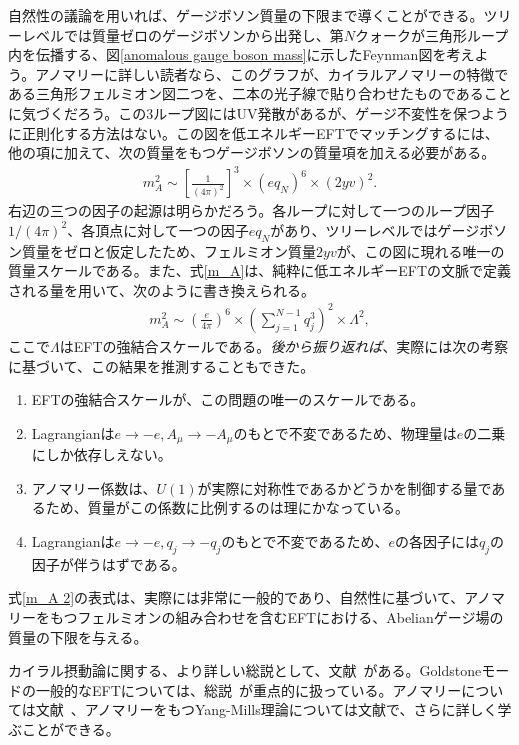 自然性の議論を用いれば、ゲージボソン質量の下限まで導くことができる。ツリーレベルでは質量ゼロのゲージボソンから出発し、第$N$クォークが三角形ループ内を伝播する、図\ref{anomalous gauge boson mass}に示したFeynman図を考えよう。アノマリーに詳しい読者なら、このグラフが、カイラルアノマリーの特徴である三角形フェルミオン図二つを、二本の光子線で貼り合わせたものであることに気づくだろう。この3ループ図にはUV発散があるが、ゲージ不変性を保つように正則化する方法はない。この図を低エネルギーEFTでマッチングするには、他の項に加えて、次の質量をもつゲージボソンの質量項を加える必要がある。
%
\begin{align} \label{m_A}
	m_A^2 \sim \left[\frac{1}{(4 \pi)^2}\right]^3 \times (e q_N)^6 \times (2 y v)^2 . 
\end{align}
%
右辺の三つの因子の起源は明らかだろう。各ループに対して一つのループ因子$1/(4 \pi)^2$、各頂点に対して一つの因子$e q_N$があり、ツリーレベルではゲージボソン質量をゼロと仮定したため、フェルミオン質量$2 y v$が、この図に現れる唯一の質量スケールである。また、式\eqref{m_A}は、純粋に低エネルギーEFTの文脈で定義される量を用いて、次のように書き換えられる。
%
\begin{align} \label{m_A 2}
	m_A^2 \sim \left(\frac{e}{4 \pi}\right)^6 \times \left(\sum_{j=1}^{N-1} q_j^3 \right)^2 \times \Lambda^2 ,
\end{align}
% 
ここで$\Lambda$はEFTの強結合スケールである。\emph{後から振り返れば}、実際には次の考察に基づいて、この結果を推測することもできた。
%
\begin{enumerate}
	\item EFTの強結合スケールが、この問題の唯一のスケールである。
	\item Lagrangianは$e \to -e, A_\mu \to - A_\mu$のもとで不変であるため、物理量は$e$の二乗にしか依存しえない。
	\item アノマリー係数は、$U(1)$が実際に対称性であるかどうかを制御する量であるため、質量がこの係数に比例するのは理にかなっている。
	\item Lagrangianは$e \to -e, q_j \to - q_j$のもとで不変であるため、$e$の各因子には$q_j$の因子が伴うはずである。
\end{enumerate}
%
式\eqref{m_A 2}の表式は、実際には非常に一般的であり、自然性に基づいて、アノマリーをもつフェルミオンの組み合わせを含むEFTにおける、Abelianゲージ場の質量の下限を与える。




カイラル摂動論に関する、より詳しい総説として、文献~\cite{Ecker:1994gg,Pich:1995bw,Scherer:2002tk}がある。Goldstoneモードの一般的なEFTについては、総説~\cite{Burgess:1998ku,Pich:2018ltt}が重点的に扱っている。アノマリーについては文献~\cite{Harvey:2005it,Bilal:2008qx}、アノマリーをもつYang-Mills理論については文献\cite{Preskill:1990fr}で、さらに詳しく学ぶことができる。




\newpage


